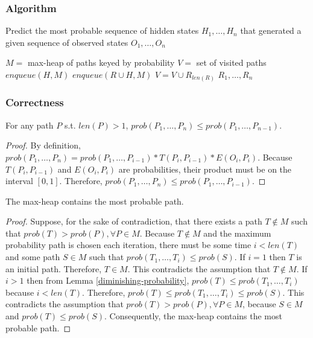 \documentclass[../main.tex]{subfiles}
\begin{document}
\subsubsection{Algorithm}
\begin{algorithm}[H]
\caption{Predict the most probable sequence of hidden states $H_1, \ldots, H_n$ that generated a given sequence of observed states $O_1, \ldots, O_n$}
\label{hmm-predict}
\begin{algorithmic}
    \State $M = $ max-heap of paths keyed by probability
    \State $V = $ set of visited paths
        \State $enqueue(H, M)$
    \EndFor
                \State $enqueue(R \cup H, M)$
                \State $V = V \cup R_{len(R)}$
            \EndFor
        \EndIf
    \EndWhile
    \State\Return $R_1, \ldots, R_n$
\EndFunction
\end{algorithmic}
\end{algorithm}

\subsubsection{Correctness}
\begin{lemma}
\label{diminishing-probability}
For any path $P$ s.t. $len(P) > 1$, $prob(P_1, \ldots, P_{n}) \le prob(P_1, \ldots, P_{n-1})$.
\end{lemma}
\begin{proof}
By definition, $prob(P_1, \ldots, P_{n}) = prob(P_1, \ldots, P_{i-1}) * T(P_i, P_{i-1}) * E(O_i, P_i)$. Because $T(P_i, P_{i-1})$ and $E(O_i, P_i)$ are probabilities, their product must be on the interval $[0, 1]$. Therefore, $prob(P_1, \ldots, P_{n}) \le prob(P_1, \ldots, P_{i-1})$.
\end{proof}

\begin{theorem}
\label{probable-path}
The max-heap contains the most probable path.
\end{theorem}
\begin{proof}
Suppose, for the sake of contradiction, that there exists a path $T \not\in M$ such that $prob(T) > prob(P), \forall P \in M$. Because $T \not\in M$ and the maximum probability path is chosen each iteration, there must be some time $i < len(T)$ and some path $S \in M$ such that $prob(T_1, \ldots, T_i) \le prob(S)$. If $i = 1$ then $T$ is an initial path. Therefore, $T \in M$. This contradicts the assumption that $T \not\in M$. If $i > 1$ then from Lemma \ref{diminishing-probability}, $prob(T) \le prob(T_1, \ldots, T_i)$ because $i < len(T)$. Therefore, $prob(T) \le prob(T_1, \ldots, T_i) \le prob(S)$. This contradicts the assumption that $prob(T) > prob(P), \forall P \in M$, because $S \in M$ and $prob(T) \le prob(S)$. Consequently, the max-heap contains the most probable path.
\end{proof}
\end{document}
